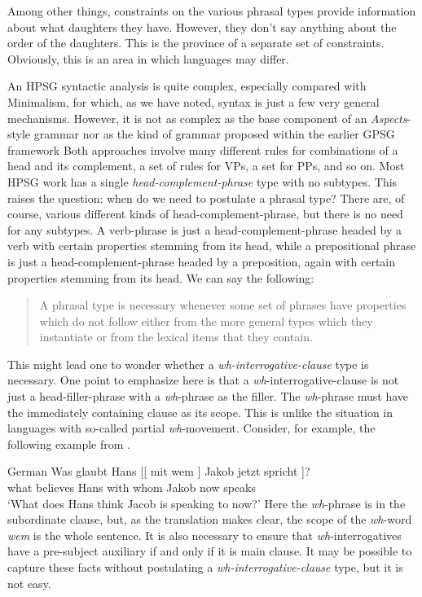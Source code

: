 \documentclass[output=paper]{langsci/langscibook}
\begin{document}
Among other things, constraints on the various phrasal types provide
information about what daughters they have. However, they don’t say anything
about the order of the daughters. This is the province of a separate set of
constraints. Obviously, this is an area in which languages may differ.

An \gls{HPSG} syntactic analysis is quite complex, especially compared with
Minimalism, for which, as we have noted, syntax is just a few very general
mechanisms. However, it is not as complex as the base component of an
\emph{Aspects}-style grammar \citep{Chomsky1965} nor as the kind of grammar
proposed within the earlier \gls{GPSG} framework \parencite{GazKlePulSag1985}
Both approaches involve many different rules for combinations of a head and its
complement, a set of rules for VPs, a set for PPs, and so on. Most \gls{HPSG}
work has a single \emph{head-complement-phrase} type with no subtypes. This
raises the question: when do we need to postulate a phrasal type? There are, of
course, various different kinds of head-complement-phrase, but there is no need
for any subtypes. A verb-phrase is just a head-complement-phrase headed by a
verb with certain properties stemming from its head, while a prepositional
phrase is just a head-complement-phrase headed by a preposition, again with
certain properties stemming from its head. We can say the following:

\begin{quote}

A phrasal type is necessary whenever some set of phrases have properties which
do not follow either from the more general types which they instantiate or from
the lexical items that they contain.

\end{quote}
%
This might lead one to wonder whether a \emph{wh-interrogative-clause} type is
necessary. One point to emphasize here is that a
\emph{wh}-interrogative-clause is not just a head-filler-phrase with a
\emph{wh}-phrase as the filler. The \emph{wh}-phrase must have the
immediately containing clause as its scope. This is unlike the situation in
languages with so-called partial \emph{wh}-movement. Consider, for example,
the following  example from \citet{McDaniel1989}.

\ea\label{ex:key:4.6} German
    \sn
    \gll    Was glaubt Hans [[ mit wem ] Jakob jetzt spricht ]?\\
            what believes Hans {} with whom {} Jakob now speaks {}\\
    \glt    \enquote*{What does Hans think Jacob is speaking to now?}
\z
%
Here the \emph{wh}-phrase is in the subordinate clause, but, as the
translation makes clear, the scope of the \emph{wh}-word \emph{wem} is
the whole sentence. It is also necessary to ensure that 
\emph{wh}-interrogatives have a pre-subject auxiliary if and only if it is
main clause. It may be possible to capture these facts without postulating a
\emph{wh-interrogative-clause} type, but it is not easy.
\end{document}

